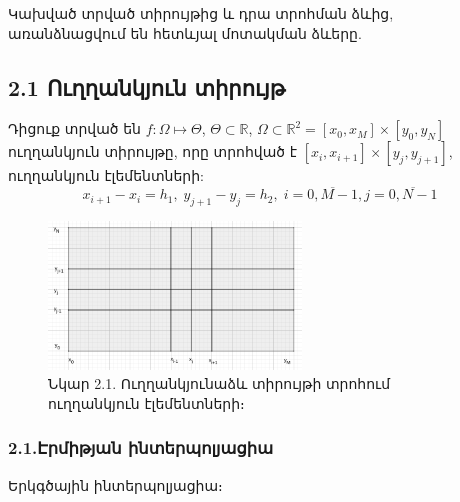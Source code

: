 \documentclass[fleqn, bachelor,subf,12pt,notitlepage]{article}
\begin{document}
Կախված տրված տիրույթից և դրա տրոհման ձևից, առանձնացվում են հետևյալ մոտակման ձևերը.
\newpage
\subsection*{2.1 Ուղղանկյուն տիրույթ}
Դիցուք տրված են $f:\Omega\mapsto \Theta$,  $\Theta \subset \mathbb{R}$, $\Omega \subset \mathbb{R}^{2} = \left[x_{0}, x_{M}\right] \times \left[y_{0}, y_{N}\right]$  ուղղանկյուն տիրույթը, որը տրոհված է $\left[x_{i}, x_{i+1}\right] \times \left[y_{j}, y_{j+1}\right]$, ուղղանկյուն էլեմենտների:
$$x_{i+1}-x_{i}=h_{1}, \; y_{j+1}-y_{j}=h_{2}, \; i=\overline{0, M-1}, j=\overline{0, N-1}$$
\begin{figure}[h!]
\centering
\includegraphics[width=0.6\textwidth]{images/two_var_linear}
\captionsetup{labelformat=empty}
\caption{Նկար 2.1. Ուղղանկյունաձև տիրույթի տրոհում ուղղանկյուն էլեմենտների։}
\end{figure}
\newpage
\subsubsection*{2.1.Էրմիթյան ինտերպոլյացիա}
Երկգծային ինտերպոլյացիա։
\end{document}

